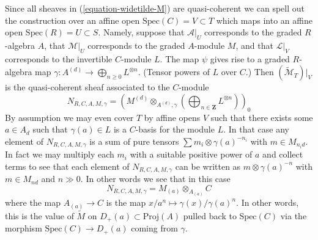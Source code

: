 \medskip\noindent
Since all sheaves in (\ref{equation-widetilde-M}) are quasi-coherent
we can spell out the construction
over an affine open $\text{Spec}(C) = V \subset T$
which maps into an affine open $\text{Spec}(R) = U \subset S$.
Namely, suppose that $\mathcal{A}|_U$ corresponds
to the graded $R$-algebra $A$, that $\mathcal{M}|_U$ corresponds to the
graded $A$-module $M$, and that $\mathcal{L}|_V$ corresponds to the
invertible $C$-module $L$. The map $\psi$ gives
rise to a graded $R$-algebra map
$\gamma : A^{(d)} \to \bigoplus_{n \geq 0} L^{\otimes n}$.
(Tensor powers of $L$ over $C$.)
Then $(\widetilde{\mathcal{M}}_T)|_V$
is the quasi-coherent sheaf associated to the $C$-module
$$
N_{R, C, A, M, \gamma} =
\left(
M^{(d)} \otimes_{A^{(d)}, \gamma}
\left(\bigoplus\nolimits_{n \in \mathbf{Z}} L^{\otimes n}\right)
\right)_0
$$
By assumption we may even cover $T$ by affine opens
$V$ such that there exists some $a \in A_d$ such that
$\gamma(a) \in L$ is a $C$-basis for the module $L$.
In that case any element of $N_{R, C, A, M, \gamma}$ is a sum
of pure tensors $\sum m_i \otimes \gamma(a)^{-n_i}$ with $m \in M_{n_id}$.
In fact we may multiply each $m_i$ with a suitable positive power
of $a$ and collect terms to see that each element of $N_{R, C, A, M, \gamma}$
can be written as $m \otimes \gamma(a)^{-n}$ with $m \in M_{nd}$ and
$n \gg 0$. In other words we see that in this case
$$
N_{R, C, A, M, \gamma} = M_{(a)}\otimes_{A_{(a)}} C
$$
where the map $A_{(a)} \to C$ is the map
$x/a^n \mapsto \gamma(x)/\gamma(a)^n$. In other words, this is
the value of $\widetilde{M}$ on $D_{+}(a) \subset \text{Proj}(A)$
pulled back to $\text{Spec}(C)$ via the morphism
$\text{Spec}(C) \to D_{+}(a)$ coming from $\gamma$.

